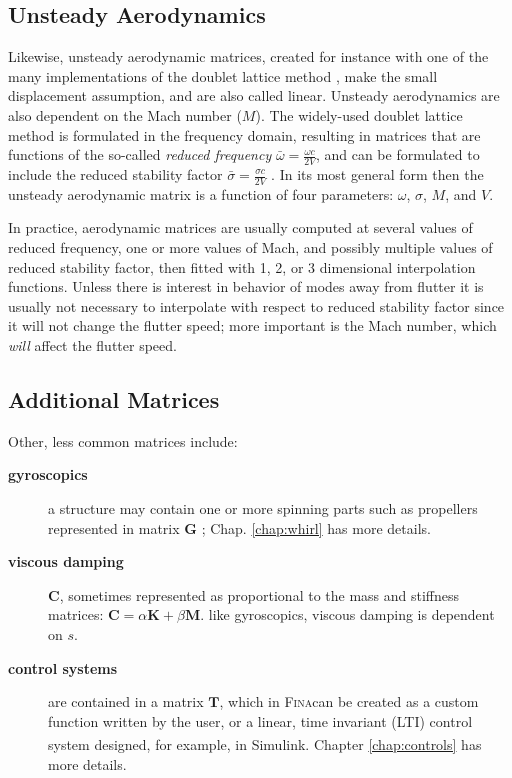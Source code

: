 \documentclass[10pt,openany,twoside]{book}
\numberwithin{equation}{section}   %
\newcommand{\Fina}{{\normalfont\scshape Fina\:}}
\newcommand{\Simulink}{{\footnotesize{Simulink\textsuperscript{\textregistered}}\:}}
\newcommand{\Matrix}[1]{\boldsymbol{#1}}
\newcommand{\Chapref}[1]{Chap. \ref{#1}}
\begin{document}
\subsection{Unsteady Aerodynamics}
Likewise, unsteady aerodynamic matrices, created for instance
with one of the many implementations of the doublet lattice method
\cite{demasi2024introduction}, make the small displacement assumption,
and are also called linear. Unsteady aerodynamics are also dependent
on the Mach number ($M$).
The widely-used doublet lattice method
is formulated in the frequency domain, resulting in matrices that
are functions of the so-called \emph{reduced frequency}
$\bar{\omega} = \frac{\omega c}{2V}$, and can be formulated to include
the reduced stability factor $\bar{\sigma} = \frac{\sigma c}{2V}$
\cite{cunningham1984generalization}.
In its most general form then the unsteady aerodynamic matrix is
a function of four parameters: $\omega$, $\sigma$, $M$, and $V$.

In practice, aerodynamic matrices are usually computed at several values
of reduced frequency, one or more values of Mach, and possibly
multiple values of reduced stability factor, then fitted with
1, 2, or 3 dimensional interpolation functions.
Unless there is interest in behavior of modes away from flutter
it is usually not necessary to interpolate with respect to reduced
stability factor since it will not change the flutter speed;
more important is the Mach number, which \emph{will} affect the flutter speed.

\subsection{Additional Matrices}
Other, less common matrices include:

\begin{description}
	\item[\bf gyroscopics] a structure may contain one or more spinning
	parts such as propellers represented in matrix $\Matrix{G}$
	; \Chapref{chap:whirl} has more details.

	\item[\bf viscous damping] $\Matrix{C}$, sometimes represented as
		proportional to the mass and stiffness matrices:
			\mbox{$\Matrix{C} = \alpha\Matrix{K} + \beta\Matrix{M}$}.
		like gyroscopics, viscous damping is dependent on $s$.

	\item[\bf control systems] are contained in a matrix $\Matrix{T}$,
		which in \Fina can be created as a custom function written by the user,
		or a linear, time invariant (LTI) control system designed, for
		example, in \Simulink. Chapter \ref{chap:controls} has more details.
\end{description}
\end{document}
